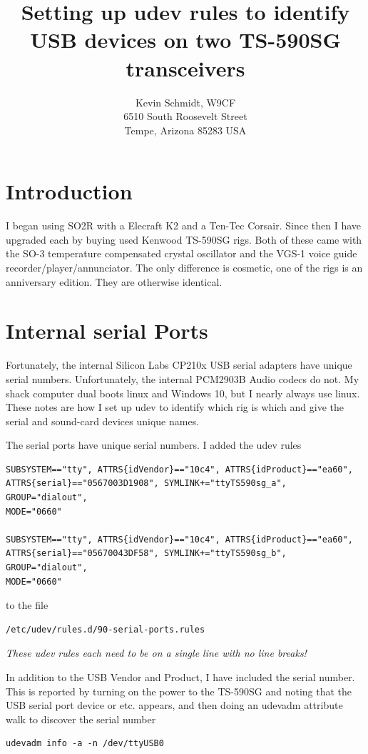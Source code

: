 \documentclass[12pt]{article}
\begin{document}
\title{
Setting up udev rules to identify USB devices on two TS-590SG transceivers
}
\author{
Kevin Schmidt, W9CF\\
6510 South Roosevelt Street\\
Tempe, Arizona 85283 USA\\
}
\date{}
\maketitle

\section{Introduction}
I began using SO2R with a Elecraft K2 and a Ten-Tec Corsair. Since then
I have upgraded each by buying used Kenwood TS-590SG rigs. Both of
these came with the SO-3 temperature compensated crystal oscillator
and the VGS-1 voice guide recorder/player/annunciator.
The only difference is cosmetic,
one of the rigs is an anniversary edition. They are otherwise identical.

\section{Internal serial Ports}
Fortunately, the internal Silicon Labs CP210x USB serial adapters have
unique serial numbers. Unfortunately, the internal PCM2903B Audio codecs
do not. My shack computer dual boots linux and Windows 10, but I nearly
always use linux. These notes are how I set up udev to identify which
rig is which and give the serial and sound-card devices unique names.

The serial ports have unique serial numbers. I added the udev rules
\begin{verbatim}
SUBSYSTEM=="tty", ATTRS{idVendor}=="10c4", ATTRS{idProduct}=="ea60",
ATTRS{serial}=="0567003D1908", SYMLINK+="ttyTS590sg_a", GROUP="dialout",
MODE="0660"

SUBSYSTEM=="tty", ATTRS{idVendor}=="10c4", ATTRS{idProduct}=="ea60",
ATTRS{serial}=="05670043DF58", SYMLINK+="ttyTS590sg_b", GROUP="dialout",
MODE="0660"
\end{verbatim}
to the file
\begin{verbatim}
/etc/udev/rules.d/90-serial-ports.rules
\end{verbatim}
{\em These udev rules each need to be on a single line with no line breaks!}

In addition to the USB Vendor and Product, I have included
the serial number. This is reported by turning on the power to the
TS-590SG and noting that the USB serial port device
 or  etc. appears, and then
doing an udevadm attribute walk to discover the serial number
\begin{verbatim}
udevadm info -a -n /dev/ttyUSB0
\end{verbatim}
\end{document}
